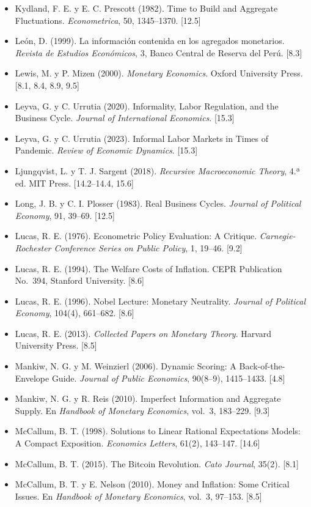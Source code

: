 \documentclass[11pt,a4paper]{article}
\begin{document}
{\begin{itemize}[leftmargin=1.4em,itemsep=1pt,label={}]
\item Kydland, F. E. y E. C. Prescott (1982). Time to Build and Aggregate Fluctuations. \emph{Econometrica}, 50, 1345--1370. [12.5]
\item León, D. (1999). La información contenida en los agregados monetarios. \emph{Revista de Estudios Económicos}, 3, Banco Central de Reserva del Perú. [8.3]
\item Lewis, M. y P. Mizen (2000). \emph{Monetary Economics}. Oxford University Press. [8.1, 8.4, 8.9, 9.5]
\item Leyva, G. y C. Urrutia (2020). Informality, Labor Regulation, and the Business Cycle. \emph{Journal of International Economics}. [15.3]
\item Leyva, G. y C. Urrutia (2023). Informal Labor Markets in Times of Pandemic. \emph{Review of Economic Dynamics}. [15.3]
\item Ljungqvist, L. y T. J. Sargent (2018). \emph{Recursive Macroeconomic Theory}, 4.ª ed. MIT Press. [14.2--14.4, 15.6]
\item Long, J. B. y C. I. Plosser (1983). Real Business Cycles. \emph{Journal of Political Economy}, 91, 39--69. [12.5]
\item Lucas, R. E. (1976). Econometric Policy Evaluation: A Critique. \emph{Carnegie-Rochester Conference Series on Public Policy}, 1, 19--46. [9.2]
\item Lucas, R. E. (1994). The Welfare Costs of Inflation. CEPR Publication No.~394, Stanford University. [8.6]
\item Lucas, R. E. (1996). Nobel Lecture: Monetary Neutrality. \emph{Journal of Political Economy}, 104(4), 661--682. [8.6]
\item Lucas, R. E. (2013). \emph{Collected Papers on Monetary Theory}. Harvard University Press. [8.5]
\item Mankiw, N. G. y M. Weinzierl (2006). Dynamic Scoring: A Back-of-the-Envelope Guide. \emph{Journal of Public Economics}, 90(8--9), 1415--1433. [4.8]
\item Mankiw, N. G. y R. Reis (2010). Imperfect Information and Aggregate Supply. En \emph{Handbook of Monetary Economics}, vol.~3, 183--229. [9.3]
\item McCallum, B. T. (1998). Solutions to Linear Rational Expectations Models: A Compact Exposition. \emph{Economics Letters}, 61(2), 143--147. [14.6]
\item McCallum, B. T. (2015). The Bitcoin Revolution. \emph{Cato Journal}, 35(2). [8.1]
\item McCallum, B. T. y E. Nelson (2010). Money and Inflation: Some Critical Issues. En \emph{Handbook of Monetary Economics}, vol.~3, 97--153. [8.5]

\end{itemize}}
\end{document}
